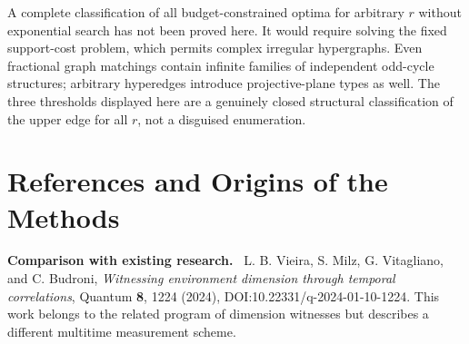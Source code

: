\documentclass[11pt,a4paper,oneside]{book}
\newcommand{\note}[1]{\par\medskip\noindent\textbf{#1}\ }
\begin{document}
A complete classification of all budget-constrained optima for arbitrary $r$ without exponential search has not been proved here. It would require solving the fixed support-cost problem, which permits complex irregular hypergraphs. Even fractional graph matchings contain infinite families of independent odd-cycle structures; arbitrary hyperedges introduce projective-plane types as well. The three thresholds displayed here are a genuinely closed structural classification of the upper edge for all $r$, not a disguised enumeration.
\setcounter{equation}{418}


\chapter*{References and Origins of the Methods}
\note{Comparison with existing research.} L. B. Vieira, S. Milz, G. Vitagliano, and C. Budroni, \emph{Witnessing environment dimension through temporal correlations}, Quantum \textbf{8}, 1224 (2024), DOI:10.22331/q-2024-01-10-1224. This work belongs to the related program of dimension witnesses but describes a different multitime measurement scheme.
\end{document}
